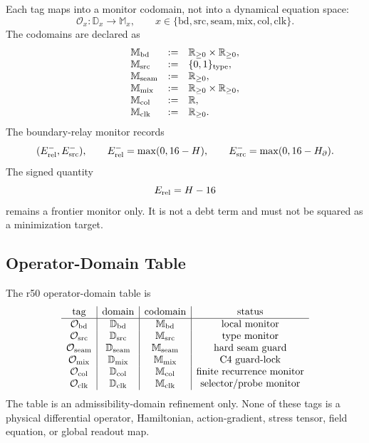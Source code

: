 Each tag maps into a monitor codomain, not into a dynamical equation space:
\[
\mathcal O_x:
\mathbb D_x\longrightarrow \mathbb M_x,
\qquad
x\in\{\mathrm{bd},\mathrm{src},\mathrm{seam},\mathrm{mix},\mathrm{col},\mathrm{clk}\}.
\]
The codomains are declared as
\[
\begin{array}{lll}
\mathbb M_{\rm bd}   &:=& \mathbb R_{\ge0}\times\mathbb R_{\ge0},\\
\mathbb M_{\rm src}  &:=& \{0,1\}_{\rm type},\\
\mathbb M_{\rm seam} &:=& \mathbb R_{\ge0},\\
\mathbb M_{\rm mix}  &:=& \mathbb R_{\ge0}\times\mathbb R_{\ge0},\\
\mathbb M_{\rm col}  &:=& \mathbb R,\\
\mathbb M_{\rm clk}  &:=& \mathbb R_{\ge0}.
\end{array}
\]
The boundary-relay monitor records
\[
(E_{\rm rel}^{-},E_{\rm src}^{-}),
\qquad
E_{\rm rel}^{-}=\max(0,16-H),
\qquad
E_{\rm src}^{-}=\max(0,16-H_{\partial}).
\]
The signed quantity
\[
E_{\rm rel}=H-16
\]
remains a frontier monitor only.  It is not a debt term and must not be squared
as a minimization target.

\subsection{Operator-Domain Table}
\label{subsec:r50-operator-domain-table}

The r50 operator-domain table is
\[
\begin{array}{c|c|c|c}
\text{tag} & \text{domain} & \text{codomain} & \text{status}\\
\hline
\mathcal O_{\rm bd} & \mathbb D_{\rm bd} & \mathbb M_{\rm bd} & \text{local monitor}\\
\mathcal O_{\rm src} & \mathbb D_{\rm src} & \mathbb M_{\rm src} & \text{type monitor}\\
\mathcal O_{\rm seam} & \mathbb D_{\rm seam} & \mathbb M_{\rm seam} & \text{hard seam guard}\\
\mathcal O_{\rm mix} & \mathbb D_{\rm mix} & \mathbb M_{\rm mix} & \text{C4 guard-lock}\\
\mathcal O_{\rm col} & \mathbb D_{\rm col} & \mathbb M_{\rm col} & \text{finite recurrence monitor}\\
\mathcal O_{\rm clk} & \mathbb D_{\rm clk} & \mathbb M_{\rm clk} & \text{selector/probe monitor}
\end{array}
\]
The table is an admissibility-domain refinement only.  None of these tags is a
physical differential operator, Hamiltonian, action-gradient, stress tensor,
field equation, or global readout map.

